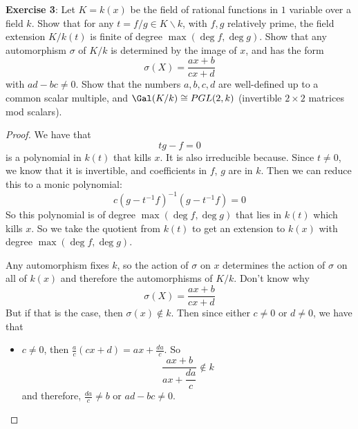 \documentclass{article}
\begin{document}
\textbf{Exercise 3}: Let $K = k(x)$ be the field of rational functions in $1$ variable over a field $k$. Show that for any $t = f/g \in K \backslash  k$, with $f, g$ relatively prime, the field extension $K/k(t)$ is finite of degree $\max(\deg f, \deg g)$. Show that any automorphism $\sigma$ of $K/k$ is determined by the image of $x$, and has the form 
    \begin{equation*}
        \sigma ( X) = \dfrac{ax + b}{cx + d}
    \end{equation*}
with $ad - bc \neq 0$. Show that the numbers $a, b, c, d$ are well-defined up to a common scalar multiple, and $\Gal(K/k) \cong PGL( 2, k)$ (invertible $2 \times 2$ matrices mod scalars).
    \begin{proof}
        We have that 
            \begin{equation*}
                tg - f = 0
            \end{equation*}
        is a polynomial in $k(t)$ that kills $x$. It is also irreducible because. Since $t \neq 0$, we know that it is invertible, and coefficients in $f$, $g$ are in $k$. Then we can reduce this to a monic polynomial:
            \begin{equation*}
                c(g - t^{-1}f)^{-1}(g - t^{-1}f) = 0
            \end{equation*}
        So this polynomial is of degree $\max(\deg f, \deg  g)$ that lies in $k(t)$ which kills $x$. So we take the quotient from $k(t)$ to get an extension to $k(x)$ with degree $\max(\deg f, \deg g)$. 

        Any automorphism fixes $k$, so the action of $\sigma$ on $x$ determines the action of $\sigma$ on all of $k(x)$ and therefore the automorphisms of $K/k$. Don't know why 
            \begin{equation*}
                 \sigma  ( X) = \dfrac{ax + b}{cx + d}
            \end{equation*}
        But if that is the case, then $\sigma ( x) \notin k$. Then since either $c \neq 0$ or $d \neq 0$, we have that 
            \begin{itemize}
                \item $c \neq 0$, then $\frac{a}{c}(cx + d) = ax + \frac{da}{c}$. So
                    \begin{equation*}
                        \dfrac{ax + b}{ax + \dfrac{da}{c}} \notin k
                    \end{equation*}
                and therefore, $\frac{da}{c} \neq b$ or $ad - bc \neq 0$.


\end{itemize}
\end{proof}
\end{document}
